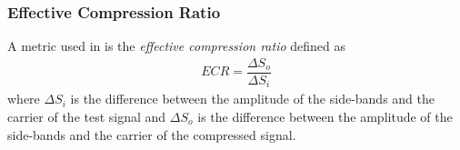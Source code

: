 \documentclass[../main2.tex]{subfiles}
\begin{document}
\subsubsection{Effective Compression Ratio}
A metric used in \cite{reiss2012tutorial} is the \emph{effective compression ratio} defined as
\begin{align}
ECR = \dfrac{\Delta S_o}{\Delta S_i}
\end{align}
where $\Delta S_i$ is the difference between the amplitude of the side-bands and the carrier of the test signal and $\Delta S_o$ is the difference between the amplitude of the side-bands and the carrier of the compressed signal.
\end{document}
